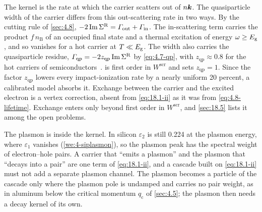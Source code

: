 The kernel is the rate at which the carrier scatters out of $n\bm{k}$. The quasiparticle width of the carrier differs from this out-scattering rate in two ways. By the cutting rule of \cref{sec:4.8}, $-2\operatorname{Im}\Sigma^{\mathrm{R}} = \varGamma_{\mathrm{out}} + \varGamma_{\mathrm{in}}$. The in-scattering term carries the product $f\,n_{\mathrm{B}}$ of an occupied final state and a thermal excitation of energy $\omega \ge E_{\mathrm{g}}$, and so vanishes for a hot carrier at $T \ll E_{\mathrm{g}}$. The width also carries the quasiparticle residue, $\varGamma_{\mathrm{qp}} = -2z_{\mathrm{qp}}\operatorname{Im}\Sigma^{\mathrm{R}}$ by \cref{eq:4.7-qp}, with $z_{\mathrm{qp}} \approx 0.8$ for the hot carriers of semiconductors~\cite[Sect.~II]{kotani2010impact}.  is first order in $W^{\mathrm{scr}}$ and sets $z_{\mathrm{qp}} = 1$. Since the factor $z_{\mathrm{qp}}$ lowers every impact-ionization rate by a nearly uniform 20 percent, a calibrated model absorbs it. Exchange between the carrier and the excited electron is a vertex correction, absent from \cref{eq:18.1-ii} as it was from \cref{eq:4.8-lifetime}. Exchange enters only beyond first order in $W^{\mathrm{scr}}$, and \cref{sec:18.5} lists it among the open problems.

The plasmon is inside the kernel. In silicon $\varepsilon_2$ is still 0.224 at the plasmon energy, where $\varepsilon_1$ vanishes (\cref{we:4-siplasmon}), so the plasmon peak has the spectral weight of electron--hole pairs. A carrier that ``emits a plasmon'' and the plasmon that ``decays into a pair'' are one term of \cref{eq:18.1-ii}, and a cascade built on \cref{eq:18.1-ii} must not add a separate plasmon channel. The plasmon becomes a particle of the cascade only where the plasmon pole is undamped and carries no pair weight, as in aluminum below the critical momentum $q_{\mathrm{c}}$ of \cref{sec:4.5}; the plasmon then needs a decay kernel of its own.

